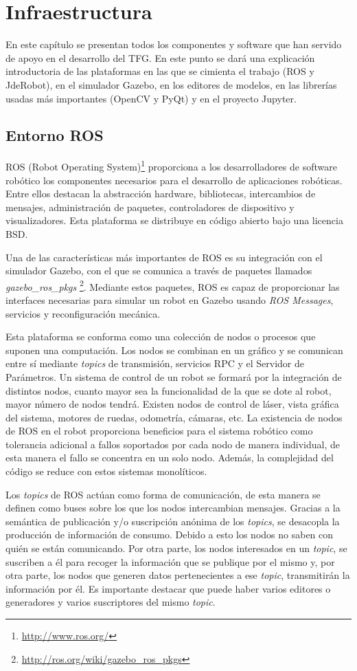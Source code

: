 \chapter{Infraestructura}\label{cap.infraestructura}
En este capítulo se presentan todos los componentes y software que han servido de apoyo en el desarrollo del TFG. En este punto se dará una explicación introductoria de las plataformas en las que se cimienta el trabajo (ROS y JdeRobot), en el simulador Gazebo, en los editores de modelos, en las librerías usadas más importantes (OpenCV y PyQt) y en el proyecto Jupyter.

\section{Entorno ROS}
ROS (Robot Operating System)\footnote{\url{http://www.ros.org/}} proporciona a los desarrolladores de software robótico los componentes necesarios para el desarrollo de aplicaciones robóticas. Entre ellos destacan la abstracción hardware, bibliotecas, intercambios de mensajes, administración de paquetes, controladores de dispositivo y visualizadores. Esta plataforma se distribuye en código abierto bajo una licencia BSD.

Una de las características más importantes de ROS es su integración con el simulador Gazebo, con el que se comunica a través de paquetes llamados \textit{gazebo\_ros\_pkgs} \footnote{\url{http://ros.org/wiki/gazebo\_ros\_pkgs}}. Mediante estos paquetes, ROS es capaz de proporcionar las interfaces necesarias para simular un robot en Gazebo usando \textit{ROS Messages}, servicios y reconfiguración mecánica.

Esta plataforma se conforma como una colección de nodos o procesos que suponen una computación. Los nodos se combinan en un gráfico y se comunican entre sí mediante \textit{topics} de transmisión, servicios RPC y el Servidor de Parámetros. Un sistema de control de un robot se formará por la integración de distintos nodos, cuanto mayor sea la funcionalidad de la que se dote al robot, mayor número de nodos tendrá. Existen nodos de control de láser, vista gráfica del sistema, motores de ruedas, odometría, cámaras, etc. La existencia de nodos de ROS en el robot proporciona beneficios para el sistema robótico como tolerancia adicional a fallos soportados por cada nodo de manera individual, de esta manera el fallo se concentra en un solo nodo. Además, la complejidad del código se reduce con estos sistemas monolíticos.

Los \textit{topics} de ROS actúan como forma de comunicación, de esta manera se definen como buses sobre los que los nodos intercambian mensajes. Gracias a la semántica de publicación y/o suscripción anónima de los \textit{topics}, se desacopla la producción de información de consumo. Debido a esto los nodos no saben con quién se están comunicando. Por otra parte, los nodos interesados en un \textit{topic}, se suscriben a él para recoger la información que se publique por el mismo y, por otra parte, los nodos que generen datos pertenecientes a ese \textit{topic}, transmitirán la información por él. Es importante destacar que puede haber varios editores o generadores y varios suscriptores del mismo \textit{topic}.

